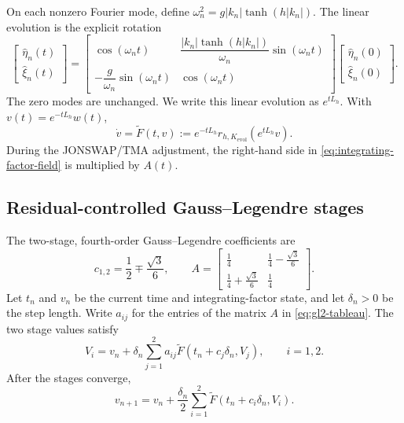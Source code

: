 \documentclass[11pt]{article}
\begin{document}
On each nonzero Fourier mode, define
$\omega_n^2=g|k_n|\tanh(h|k_n|)$.  The linear evolution is the explicit
rotation
\begin{equation}
  \begin{bmatrix}\widehat\eta_n(t)\\ \widehat\xi_n(t)\end{bmatrix}
  =
  \begin{bmatrix}
    \cos(\omega_nt) &
      \dfrac{|k_n|\tanh(h|k_n|)}{\omega_n}\sin(\omega_nt)\\[4pt]
    -\dfrac{g}{\omega_n}\sin(\omega_nt) & \cos(\omega_nt)
  \end{bmatrix}
  \begin{bmatrix}\widehat\eta_n(0)\\ \widehat\xi_n(0)\end{bmatrix}.
  \label{eq:linear-mode-evolution}
\end{equation}
The zero modes are unchanged.  We write this linear evolution as $e^{tL_h}$.
With $v(t)=e^{-tL_h}w(t)$,
\begin{equation}
  \dot v=\widetilde F(t,v)
  :=e^{-tL_h}r_{h,K_{\mathrm{evol}}}(e^{tL_h}v).
  \label{eq:integrating-factor-field}
\end{equation}
During the JONSWAP/TMA adjustment, the right-hand side in
\eqref{eq:integrating-factor-field} is multiplied by \(A(t)\).

\subsection{Residual-controlled Gauss--Legendre stages}

The two-stage, fourth-order Gauss--Legendre coefficients are
\begin{equation}
  c_{1,2}=\frac12\mp\frac{\sqrt3}{6},\qquad
  A=\begin{bmatrix}
    \frac14&\frac14-\frac{\sqrt3}{6}\\[2pt]
    \frac14+\frac{\sqrt3}{6}&\frac14
  \end{bmatrix}.
  \label{eq:gl2-tableau}
\end{equation}
Let $t_n$ and $v_n$ be the current time and integrating-factor state, and
let $\delta_n>0$ be the step length.  Write $a_{ij}$ for the entries of the
matrix $A$ in \eqref{eq:gl2-tableau}.  The two stage values satisfy
\begin{equation}
  V_i=v_n+\delta_n\sum_{j=1}^{2}a_{ij}
       \widetilde F(t_n+c_j\delta_n,V_j),
  \qquad i=1,2.
  \label{eq:gl2-stages}
\end{equation}
After the stages converge,
\begin{equation}
  v_{n+1}=v_n+\frac{\delta_n}{2}
  \sum_{i=1}^2\widetilde F(t_n+c_i\delta_n,V_i).
  \label{eq:gl2-update}
\end{equation}
\end{document}
